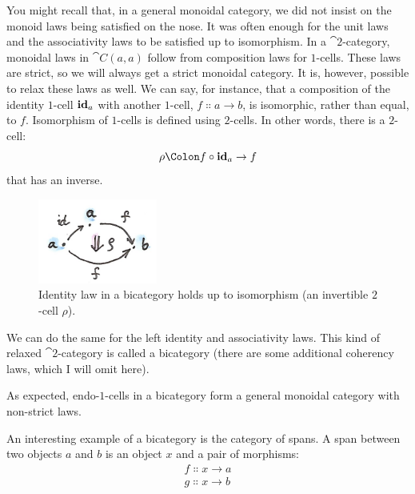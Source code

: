 You might recall that, in a general monoidal category, we did not insist
on the monoid laws being satisfied on the nose. It was often enough for
the unit laws and the associativity laws to be satisfied up to
isomorphism. In a $\cat{2}$-category, monoidal laws in $\cat{C}(a, a)$ follow
from composition laws for $1$-cells. These laws are strict, so we will
always get a strict monoidal category. It is, however, possible to relax
these laws as well. We can say, for instance, that a composition of the
identity $1$-cell $\idarrow[a]$ with another $1$-cell,
$f \Colon a \to b$, is isomorphic, rather than equal,
to $f$. Isomorphism of $1$-cells is defined using $2$-cells. In other
words, there is a $2$-cell:
\[\rho \Colon f \circ \idarrow[a] \to f\]
that has an inverse.

\begin{figure}[H]
\centering
\includegraphics[width=0.35\textwidth]{images/bicat.png}
\caption{Identity law in a bicategory holds up to isomorphism (an invertible
$2$-cell $\rho$).}
\end{figure}

\noindent
We can do the same for the left identity and associativity laws. This
kind of relaxed $\cat{2}$-category is called a bicategory (there are some
additional coherency laws, which I will omit here).

As expected, endo-$1$-cells in a bicategory form a general monoidal
category with non-strict laws.

An interesting example of a bicategory is the category of spans. A span
between two objects $a$ and $b$ is an object $x$
and a pair of morphisms:
\begin{gather*}
f \Colon x \to a \\
g \Colon x \to b
\end{gather*}

\begin{figure}[H]
\centering
{}
\end{figure}


